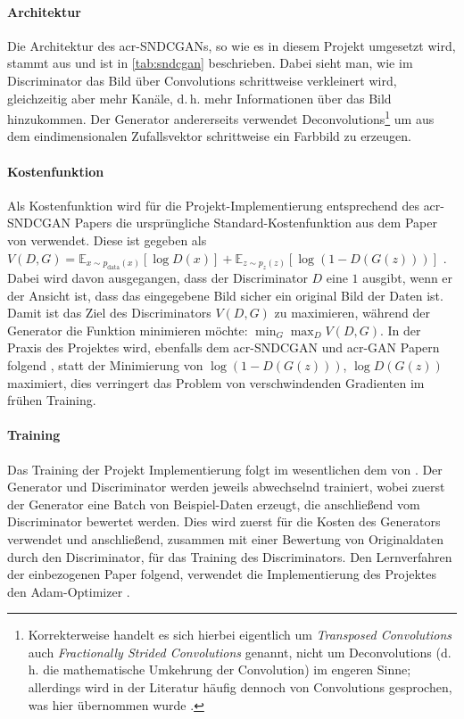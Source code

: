 \paragraph{Architektur} Die Architektur des \gls{acr-SNDCGAN}s, so wie es in
diesem Projekt umgesetzt wird, stammt aus 
\cite{kurach2018gan} und ist in \cref{tab:sndcgan} beschrieben. Dabei sieht man,
wie im Discriminator das Bild über Convolutions schrittweise verkleinert wird,
gleichzeitig aber mehr Kanäle, d.\,h. mehr Informationen über das Bild
hinzukommen. Der Generator andererseits verwendet
Deconvolutions\footnote{Korrekterweise handelt es sich hierbei eigentlich um
\emph{Transposed Convolutions} auch \emph{Fractionally Strided Convolutions}
genannt, nicht um Deconvolutions (d.\,h. die mathematische Umkehrung der
Convolution) im engeren Sinne; allerdings wird in der Literatur häufig dennoch
von Convolutions gesprochen, was hier übernommen wurde \cites[vgl.][S.
20]{dumoulin2016guide}[vgl.][S. 4]{radford2015unsupervised}.} um aus dem
eindimensionalen Zufallsvektor schrittweise ein Farbbild zu erzeugen.

\paragraph{Kostenfunktion} Als Kostenfunktion wird für die
Projekt-Implementierung entsprechend des \gls{acr-SNDCGAN} Papers die
ursprüngliche Standard-Kostenfunktion aus dem Paper von
\citeauthor{goodfellow2014generative} \cite{goodfellow2014generative} verwendet.
Diese ist gegeben als $V(D, G) = \mathbb{E}_{x \sim p_{\text{data}}(x)} [\log
D(x)] + \mathbb{E}_{z \sim p_{z}(z)} [\log (1-D(G(z)))]$ \cite[S.
3]{goodfellow2014generative}. Dabei wird davon ausgegangen, dass der
Discriminator $D$ eine $1$ ausgibt, wenn er der Ansicht ist, dass das
eingegebene Bild sicher ein original Bild der Daten ist. Damit ist das Ziel des
Discriminators $V(D,G)$ zu maximieren, während der Generator die Funktion
minimieren möchte: $\min_{G} \max_{D} V(D,G)$. In der Praxis des Projektes wird,
ebenfalls dem \gls{acr-SNDCGAN} und \gls{acr-GAN} Papern folgend \cites[S.
3]{goodfellow2014generative}[S. 6]{miyato2018spectral}, statt der Minimierung
von $\log(1-D(G(z)))$, $\log D(G(z))$ maximiert, dies verringert das Problem von
verschwindenden Gradienten im frühen Training.

\paragraph{Training} Das Training der Projekt Implementierung folgt im
wesentlichen dem von \citeauthor{goodfellow2014generative}
\cite{goodfellow2014generative}. Der Generator und Discriminator werden jeweils
abwechselnd trainiert, wobei zuerst der Generator eine Batch von Beispiel-Daten
erzeugt, die anschließend vom Discriminator bewertet werden. Dies wird zuerst
für die Kosten des Generators verwendet und anschließend, zusammen mit einer
Bewertung von Originaldaten durch den Discriminator, für das Training des
Discriminators. Den Lernverfahren der einbezogenen Paper
\cite{radford2015unsupervised,miyato2018spectral,kurach2018gan} folgend,
verwendet die Implementierung des Projektes den Adam-Optimizer
\cite{kingma2014adam}.

